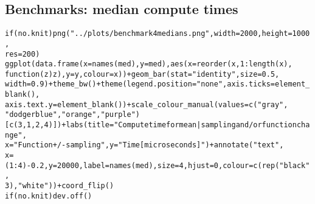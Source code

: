 \documentclass{article}\usepackage[]{graphicx}\usepackage[]{color}
\makeatletter
\newcommand{\hlnum}[1]{\textcolor[rgb]{0.863,0.196,0.184}{#1}}%
\newcommand{\hlstr}[1]{\textcolor[rgb]{0.863,0.196,0.184}{#1}}%
\newcommand{\hlopt}[1]{\textcolor[rgb]{0.576,0.631,0.631}{#1}}%
\newcommand{\hlstd}[1]{\textcolor[rgb]{0.514,0.58,0.588}{#1}}%
\newcommand{\hlkwa}[1]{\textcolor[rgb]{0.796,0.294,0.086}{#1}}%
\newcommand{\hlkwc}[1]{\textcolor[rgb]{0.796,0.294,0.086}{#1}}%
\newcommand{\hlkwd}[1]{\textcolor[rgb]{0.576,0.631,0.631}{#1}}%
\newenvironment{kframe}{%
 \def\at@end@of@kframe{}%
 \ifinner\ifhmode%
  \def\at@end@of@kframe{\end{minipage}}%
  \begin{minipage}{\columnwidth}%
 \fi\fi%
 \def\FrameCommand##1{\hskip\@totalleftmargin \hskip-\fboxsep
 \colorbox{shadecolor}{##1}\hskip-\fboxsep
     \hskip-\linewidth \hskip-\@totalleftmargin \hskip\columnwidth}%
 \MakeFramed {\advance\hsize-\width
   \@totalleftmargin\z@ \linewidth\hsize
   \@setminipage}}%
 {\par\unskip\endMakeFramed%
 \at@end@of@kframe}
\newenvironment{knitrout}{}{} %
\makeatother
\begin{document}
\subsection{Benchmarks: median compute times}

\begin{knitrout}
\color{fgcolor}\begin{kframe}
\begin{alltt}
\hlkwa{if} \hlstd{(no.knit)} \hlkwd{png}\hlstd{(}\hlstr{"../plots/benchmark4medians.png"}\hlstd{,} \hlkwc{width} \hlstd{=} \hlnum{2000}\hlstd{,} \hlkwc{height} \hlstd{=} \hlnum{1000}\hlstd{,}
    \hlkwc{res} \hlstd{=} \hlnum{200}\hlstd{)}
\hlkwd{ggplot}\hlstd{(}\hlkwd{data.frame}\hlstd{(}\hlkwc{x} \hlstd{=} \hlkwd{names}\hlstd{(med),} \hlkwc{y} \hlstd{= med),} \hlkwd{aes}\hlstd{(}\hlkwc{x} \hlstd{=} \hlkwd{reorder}\hlstd{(x,} \hlnum{1}\hlopt{:}\hlkwd{length}\hlstd{(x),}
    \hlkwa{function}\hlstd{(}\hlkwc{z}\hlstd{) z),} \hlkwc{y} \hlstd{= y,} \hlkwc{colour} \hlstd{= x))} \hlopt{+} \hlkwd{geom_bar}\hlstd{(}\hlkwc{stat} \hlstd{=} \hlstr{"identity"}\hlstd{,} \hlkwc{size} \hlstd{=} \hlnum{0.5}\hlstd{,}
    \hlkwc{width} \hlstd{=} \hlnum{0.9}\hlstd{)} \hlopt{+} \hlkwd{theme_bw}\hlstd{()} \hlopt{+} \hlkwd{theme}\hlstd{(}\hlkwc{legend.position} \hlstd{=} \hlstr{"none"}\hlstd{,} \hlkwc{axis.ticks} \hlstd{=} \hlkwd{element_blank}\hlstd{(),}
    \hlkwc{axis.text.y} \hlstd{=} \hlkwd{element_blank}\hlstd{())} \hlopt{+} \hlkwd{scale_colour_manual}\hlstd{(}\hlkwc{values} \hlstd{=} \hlkwd{c}\hlstd{(}\hlstr{"gray"}\hlstd{,}
    \hlstr{"dodgerblue"}\hlstd{,} \hlstr{"orange"}\hlstd{,} \hlstr{"purple"}\hlstd{)[}\hlkwd{c}\hlstd{(}\hlnum{3}\hlstd{,} \hlnum{1}\hlstd{,} \hlnum{2}\hlstd{,} \hlnum{4}\hlstd{)])} \hlopt{+} \hlkwd{labs}\hlstd{(}\hlkwc{title} \hlstd{=} \hlstr{"Compute time for mean | sampling and/or function change"}\hlstd{,}
    \hlkwc{x} \hlstd{=} \hlstr{"Function +/- sampling"}\hlstd{,} \hlkwc{y} \hlstd{=} \hlstr{"Time [microseconds]"}\hlstd{)} \hlopt{+} \hlkwd{annotate}\hlstd{(}\hlstr{"text"}\hlstd{,}
    \hlkwc{x} \hlstd{= (}\hlnum{1}\hlopt{:}\hlnum{4}\hlstd{)} \hlopt{-} \hlnum{0.2}\hlstd{,} \hlkwc{y} \hlstd{=} \hlnum{20000}\hlstd{,} \hlkwc{label} \hlstd{=} \hlkwd{names}\hlstd{(med),} \hlkwc{size} \hlstd{=} \hlnum{4}\hlstd{,} \hlkwc{hjust} \hlstd{=} \hlnum{0}\hlstd{,} \hlkwc{colour} \hlstd{=} \hlkwd{c}\hlstd{(}\hlkwd{rep}\hlstd{(}\hlstr{"black"}\hlstd{,}
        \hlnum{3}\hlstd{),} \hlstr{"white"}\hlstd{))} \hlopt{+} \hlkwd{coord_flip}\hlstd{()}
\hlkwa{if} \hlstd{(no.knit)} \hlkwd{dev.off}\hlstd{()}
\end{alltt}
\end{kframe}
\end{knitrout}
\end{document}
